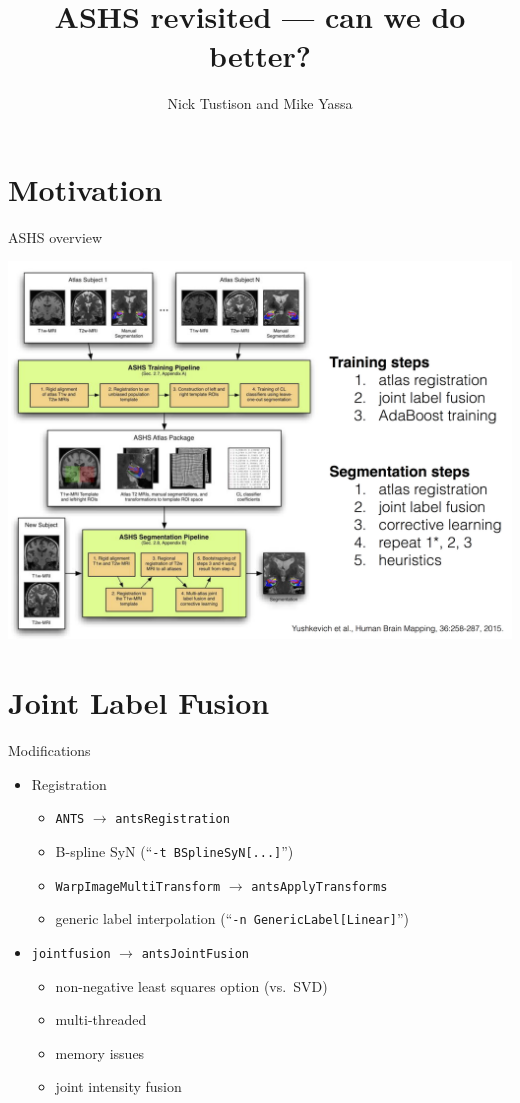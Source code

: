 \documentclass[ignorenonframetext,]{beamer}
\institute{UCI}
\title{ASHS revisited --- can we do better?}
\author{Nick Tustison and Mike Yassa}
\date{}
\providecommand{\tightlist}{%
\setlength{\itemsep}{0pt}\setlength{\parskip}{0pt}}
\begin{document}
\frame{\titlepage}

\section{Motivation}\label{motivation}

\begin{frame}{ASHS overview}

\centering
\includegraphics[width=0.85 \textwidth]{../Figures/ashs.png}

\end{frame}

\section{Joint Label Fusion}\label{joint-label-fusion}

\begin{frame}[fragile]{Modifications}

\begin{itemize}
\tightlist
\item
  Registration

  \begin{itemize}
  \tightlist
  \item
    \texttt{ANTS} \(\rightarrow\) \texttt{antsRegistration}
  \item
    B-spline SyN (``\texttt{-t\ BSplineSyN{[}...{]}}'')
  \item
    \texttt{WarpImageMultiTransform} \(\rightarrow\)
    \texttt{antsApplyTransforms}
  \item
    generic label interpolation
    (``\texttt{-n\ GenericLabel{[}Linear{]}}'')
  \end{itemize}
\item
  \texttt{jointfusion} \(\rightarrow\) \texttt{antsJointFusion}

  \begin{itemize}
  \tightlist
  \item
    non-negative least squares option (vs.~SVD)
  \item
    multi-threaded
  \item
    memory issues
  \item
    joint intensity fusion
  \end{itemize}
\end{itemize}

\end{frame}
\end{document}

